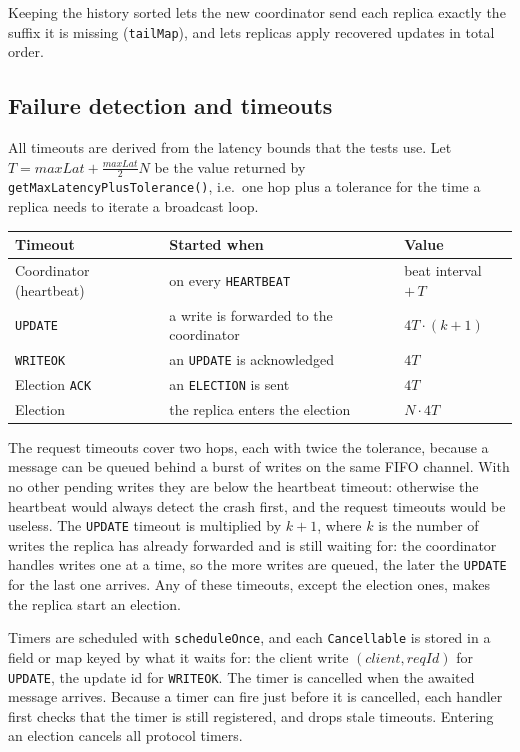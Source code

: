 Keeping the history sorted lets the new coordinator send each replica exactly the suffix it is missing (\texttt{tailMap}), and lets replicas apply recovered updates in total order.

\subsection{Failure detection and timeouts}

All timeouts are derived from the latency bounds that the tests use. Let $T = \mathit{maxLat} + \frac{\mathit{maxLat}}{2}N$ be the value returned by \texttt{getMaxLatency}\allowbreak\texttt{PlusTolerance()}, i.e.\ one hop plus a tolerance for the time a replica needs to iterate a broadcast loop.

\begin{center}
\begin{tabular}{l l l}
\hline
\textbf{Timeout} & \textbf{Started when} & \textbf{Value} \\
\hline
Coordinator (heartbeat) & on every \texttt{HEARTBEAT} & beat interval $+\,T$ \\
\texttt{UPDATE} & a write is forwarded to the coordinator & $4T \cdot (k+1)$ \\
\texttt{WRITEOK} & an \texttt{UPDATE} is acknowledged & $4T$ \\
Election \texttt{ACK} & an \texttt{ELECTION} is sent & $4T$ \\
Election & the replica enters the election & $N \cdot 4T$ \\
\hline
\end{tabular}
\end{center}

The request timeouts cover two hops, each with twice the tolerance, because a message can be queued behind a burst of writes on the same FIFO channel. With no other pending writes they are below the heartbeat timeout: otherwise the heartbeat would always detect the crash first, and the request timeouts would be useless. The \texttt{UPDATE} timeout is multiplied by $k+1$, where $k$ is the number of writes the replica has already forwarded and is still waiting for: the coordinator handles writes one at a time, so the more writes are queued, the later the \texttt{UPDATE} for the last one arrives. Any of these timeouts, except the election ones, makes the replica start an election.

Timers are scheduled with \texttt{scheduleOnce}, and each \texttt{Cancellable} is stored in a field or map keyed by what it waits for: the client write $(\mathit{client}, \mathit{reqId})$ for \texttt{UPDATE}, the update id for \texttt{WRITEOK}. The timer is cancelled when the awaited message arrives. Because a timer can fire just before it is cancelled, each handler first checks that the timer is still registered, and drops stale timeouts. Entering an election cancels all protocol timers.

